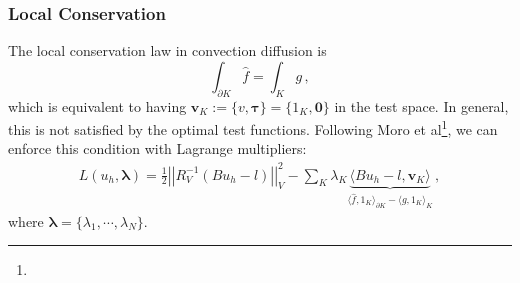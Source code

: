 \documentclass[mathserif]{beamer}
\def\btau{\boldsymbol\tau}
\def\blambda{\boldsymbol\lambda}
\newcommand{\norm}[1]{\left|\left|#1\right|\right|}
\newcommand{\FootSize}{\scriptsize}
\begin{document}
\begin{frame}
\frametitle{Local Conservation}
The local conservation law in convection diffusion is 
\[
\int_{\partial K}\hat f=\int_K g\,,
\]
which is equivalent to having $\mathbf{v}_K:=\{v,\btau\}=\{1_K,\boldsymbol0\}$ in the test space.
In general, this is not satisfied by the optimal test functions. 
Following Moro et al\footnote{\FootSize {}}, we
can enforce this condition with Lagrange multipliers:
\begin{align*}
L(u_h,\blambda) = \frac{1}{2}\norm{R_V^{-1}(Bu_h-l)}_V^2
-\sum_K\lambda_K\underbrace{\langle Bu_h-l,\mathbf{v}_K\rangle}_
{\langle\hat f, 1_K\rangle_{\partial K}-\langle g,1_K\rangle_K}\,,
\end{align*}
where $\blambda=\{\lambda_1,\cdots,\lambda_N\}$. 
\end{frame}

\end{document}
